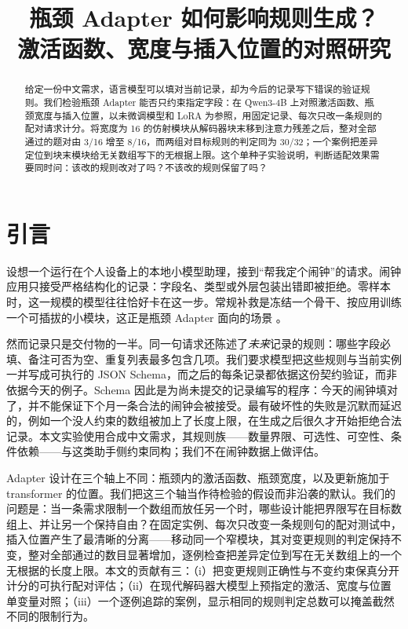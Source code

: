 \title{瓶颈 Adapter 如何影响规则生成？\\激活函数、宽度与插入位置的对照研究}
\PaperAuthor
\maketitle

\begin{abstract}
给定一份中文需求，语言模型可以填对当前记录，却为今后的记录写下错误的验证规则。我们检验瓶颈 Adapter 能否只约束指定字段：在 Qwen3-4B 上对照激活函数、瓶颈宽度与插入位置，以未微调模型和 LoRA 为参照，用固定记录、每次只改一条规则的配对请求计分。将宽度为 16 的仿射模块从解码器块末移到注意力残差之后，整对全部通过的题对由 3/16 增至 8/16，而两组对目标规则的判定同为 30/32；一个案例把差异定位到块末模块给无关数组写下的无根据上限。这个单种子实验说明，判断适配效果需要同时问：该改的规则改对了吗？不该改的规则保留了吗？
\end{abstract}

\section{引言}
设想一个运行在个人设备上的本地小模型助理，接到“帮我定个闹钟”的请求。闹钟应用只接受严格结构化的记录：字段名、类型或外层包装出错即被拒绝。零样本时，这一规模的模型往往恰好卡在这一步。常规补救是冻结一个骨干、按应用训练一个可插拔的小模块，这正是瓶颈 Adapter 面向的场景 \citep{houlsby2019}。

然而记录只是交付物的一半。同一句请求还陈述了\emph{未来}记录的规则：哪些字段必填、备注可否为空、重复列表最多包含几项。我们要求模型把这些规则与当前实例一并写成可执行的 JSON Schema，而之后的每条记录都依据这份契约验证，而非依据今天的例子。Schema 因此是为尚未提交的记录编写的程序：今天的闹钟填对了，并不能保证下个月一条合法的闹钟会被接受。最有破坏性的失败是沉默而延迟的，例如一个没人约束的数组被加上了长度上限，在生成之后很久才开始拒绝合法记录。本文实验使用合成中文需求，其规则族——数量界限、可选性、可空性、条件依赖——与这类助手侧约束同构；我们不在闹钟数据上做评估。

Adapter 设计在三个轴上不同：瓶颈内的激活函数、瓶颈宽度，以及更新施加于 transformer 的位置。我们把这三个轴当作待检验的假设而非沿袭的默认。我们的问题是：当一条需求限制一个数组而放任另一个时，哪些设计能把界限写在目标数组上、并让另一个保持自由？在固定实例、每次只改变一条规则句的配对测试中，插入位置产生了最清晰的分离——移动同一个窄模块，其对变更规则的判定保持不变，整对全部通过的数目显著增加，逐例检查把差异定位到写在无关数组上的一个无根据的长度上限。本文的贡献有三：（i）把变更规则正确性与不变约束保真分开计分的可执行配对评估；（ii）在现代解码器大模型上预指定的激活、宽度与位置单变量对照；（iii）一个逐例追踪的案例，显示相同的规则判定总数可以掩盖截然不同的限制行为。

